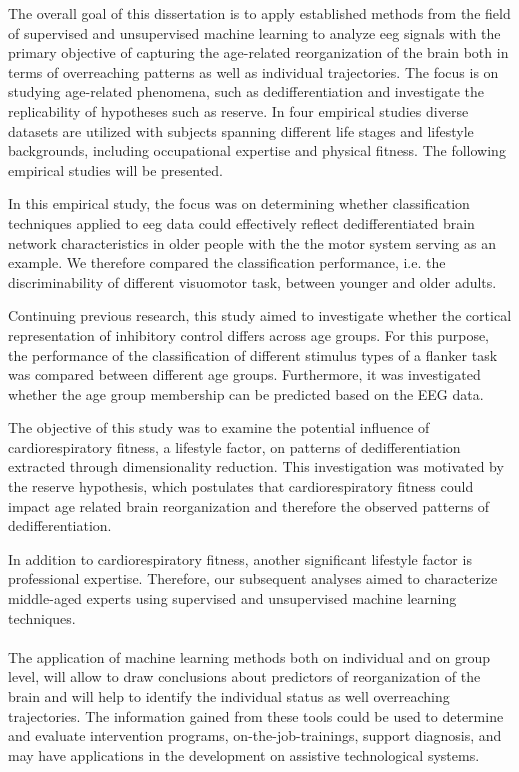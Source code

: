 The overall goal of this dissertation is to apply established methods from the field of supervised and unsupervised machine learning to analyze \gls{eeg} signals with the primary objective of capturing the age-related reorganization of the brain both in terms of overreaching patterns as well as individual trajectories. The focus is on studying age-related phenomena, such as dedifferentiation and investigate the replicability of hypotheses such as reserve. In four empirical studies diverse datasets are utilized with subjects spanning different life stages and lifestyle backgrounds, including occupational expertise and physical fitness. The following empirical studies will be presented.
\begin{quote}
\end{quote}
In this empirical study, the focus was on determining whether classification techniques applied to \gls{eeg} data could effectively reflect dedifferentiated brain network characteristics in older people with the the motor system serving as an example. We therefore compared the classification performance, i.e. the discriminability of different visuomotor task, between younger and older adults.

\begin{quote}
\end{quote}
Continuing previous research, this study aimed to investigate whether the cortical representation of inhibitory control differs across age groups. For this purpose, the performance of the classification of different stimulus types of a flanker task was compared between different age groups. Furthermore, it was investigated whether the age group membership can be predicted based on the EEG data.

\begin{quote}
\end{quote}
The objective of this study was to examine the potential influence of cardiorespiratory fitness, a lifestyle factor, on patterns of dedifferentiation extracted through dimensionality reduction. This investigation was motivated by the reserve hypothesis, which postulates that cardiorespiratory fitness could impact age related brain reorganization and therefore the observed patterns of dedifferentiation.

\begin{quote}
\end{quote}
In addition to cardiorespiratory fitness, another significant lifestyle factor is professional expertise. Therefore, our subsequent analyses aimed to characterize middle-aged experts using supervised and unsupervised machine learning techniques.\\
\\
The application of machine learning methods both on individual and on group level, will allow to draw conclusions about predictors of reorganization of the brain and will help to identify the individual status as well overreaching trajectories. The information gained from these tools could be used to determine and evaluate intervention programs, on-the-job-trainings, support diagnosis, and may have applications in the development on assistive technological systems. 